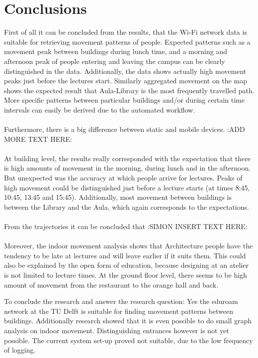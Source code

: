 \chapter{Conclusions}\label{conclusion}


First of all it can be concluded from the results, that the Wi-Fi network data is suitable for retrieving movement patterns of people. Expected patterns such as a movement peak between buildings during lunch time, and a morning and afternoon peak of people entering and leaving the campus can be clearly distinguished in the data. Additionally, the data shows actually high movement peaks just before the lectures start. Similarly aggregated movement on the map shows the expected result that Aula-Library is the most frequently travelled path. More specific patterns between particular buildings and/or during certain time intervals can easily be derived due to the automated workflow.\\\\
Furthermore, there is a big difference between static and mobile devices. :ADD MORE TEXT HERE:\\\\
At building level, the results really corresponded with the expectation that there is high amounts of movement in the morning, during lunch and in the afternoon. But unexpected was the accuracy at which people arrive for lectures. Peaks of high movement could be distinguished just before a lecture starts (at times 8:45, 10:45, 13:45 and 15:45). Additionally, most movement between buildings is between the Library and the Aula, which again corresponds to the expectations.\\\\
From the trajectories it can be concluded that :SIMON INSERT TEXT HERE:\\\\
Moreover, the indoor movement analysis shows that Architecture people have the tendency to be late at lectures and will leave earlier if it suits them. This could also be explained by the open form of education, because designing at an atelier is not limited to lecture times. At the ground floor level, there seems to be high amount of movement from the restaurant to the orange hall and back.

To conclude the research and answer the research question: Yes the eduroam network at the TU Delft is suitable for finding movement patterns between buildings. Additionally research showed that it is even possible to do small graph analysis on indoor movement. Distinguishing entrances however is not yet possible. The current system set-up proved not suitable, due to the low frequency of logging.